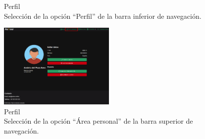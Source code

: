 \begin{figure}[H]
\begin{minipage}{0.45\textwidth}
		\caption{Perfil \\ Selección de la opción “Perfil” de la barra inferior de navegación.}
		\label{fig:areaPersonal-app}
	\end{minipage}
\end{figure}

\begin{figure}[H]
	\centering
	\includegraphics[width=0.5\textwidth]{7-Construccion/Manuales/web/area personal opcion.png}
	\caption{Perfil \\ Selección de la opción “Área personal” de la barra superior de navegación.}
	\label{fig:areaPersonal-web}
\end{figure}

